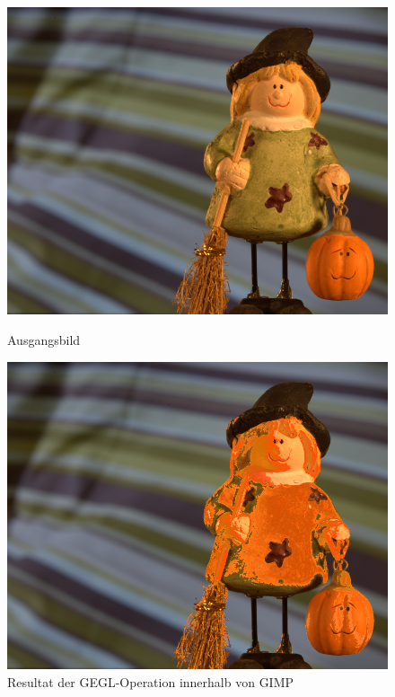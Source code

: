 \documentclass[10pt,a4paper]{article}
\begin{document}
\begin{figure}[H]
\centering
\begin{minipage}{.5\textwidth}
\includegraphics[scale=0.15]{img/matting-global.png}
\caption{Ausgangsbild}
\label{fig:CE_aus}
\end{minipage}%
\centering
\begin{minipage}{.5\textwidth}
\includegraphics[scale=0.15]{img/matting-global_gegl_in_gimp.png}
\caption{Resultat der GEGL-Operation innerhalb von GIMP}
\label{fig:CE_gegl}
\end{minipage}
\end{figure}
\end{document}
